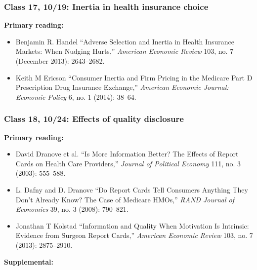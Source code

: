 \documentclass[11pt,]{article}
\providecommand{\tightlist}{%
  \setlength{\itemsep}{0pt}\setlength{\parskip}{0pt}}
\begin{document}
\hypertarget{class-17-1019-inertia-in-health-insurance-choice}{%
\subsubsection{Class 17, 10/19: Inertia in health insurance
choice}\label{class-17-1019-inertia-in-health-insurance-choice}}

\textbf{Primary reading:}

\begin{itemize}
\tightlist
\item
  Benjamin R. Handel {``Adverse {Selection} and {Inertia} in {Health}
  {Insurance} {Markets}: {When} {Nudging} {Hurts},''} \emph{American
  Economic Review} 103, no. 7 (December 2013): 2643--2682.
\item
  Keith M Ericson {``Consumer Inertia and Firm Pricing in the {Medicare}
  {Part} {D} Prescription Drug Insurance Exchange,''} \emph{American
  Economic Journal: Economic Policy} 6, no. 1 (2014): 38--64.
\end{itemize}

\hypertarget{class-18-1024-effects-of-quality-disclosure}{%
\subsubsection{Class 18, 10/24: Effects of quality
disclosure}\label{class-18-1024-effects-of-quality-disclosure}}

\textbf{Primary reading:}

\begin{itemize}
\tightlist
\item
  David Dranove et al. {``Is {More} {Information} {Better}? {The}
  {Effects} of {Report} {Cards} on {Health} {Care} {Providers},''}
  \emph{Journal of Political Economy} 111, no. 3 (2003): 555--588.
\item
  L. Dafny and D. Dranove {``Do Report Cards Tell Consumers Anything
  They Don't Already Know? {The} Case of {Medicare} {HMOs},''}
  \emph{RAND Journal of Economics} 39, no. 3 (2008): 790--821.
\item
  Jonathan T Kolstad {``Information and Quality When Motivation Is
  Intrinsic: {Evidence} from Surgeon Report Cards,''} \emph{American
  Economic Review} 103, no. 7 (2013): 2875--2910.
\end{itemize}

\textbf{Supplemental:}
\end{document}
